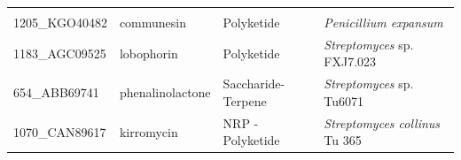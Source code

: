 \documentclass[12pt,twoside]{reedthesis}
\begin{document}
\begin{longtable}[]{@{}llll@{}}
\begin{minipage}[t]{0.34\columnwidth}
  \end{minipage}\tabularnewline
  \begin{minipage}[t]{0.19\columnwidth}\raggedright\strut
  1205\_KGO40482\strut
  \end{minipage} & \begin{minipage}[t]{0.20\columnwidth}\raggedright\strut
  communesin\strut
  \end{minipage} & \begin{minipage}[t]{0.15\columnwidth}\raggedright\strut
  Polyketide\strut
  \end{minipage} & \begin{minipage}[t]{0.34\columnwidth}\raggedright\strut
  \emph{Penicillium expansum}\strut
  \end{minipage}\tabularnewline
  \begin{minipage}[t]{0.19\columnwidth}\raggedright\strut
  1183\_AGC09525\strut
  \end{minipage} & \begin{minipage}[t]{0.20\columnwidth}\raggedright\strut
  lobophorin\strut
  \end{minipage} & \begin{minipage}[t]{0.15\columnwidth}\raggedright\strut
  Polyketide\strut
  \end{minipage} & \begin{minipage}[t]{0.34\columnwidth}\raggedright\strut
  \emph{Streptomyces} sp. FXJ7.023\strut
  \end{minipage}\tabularnewline
  \begin{minipage}[t]{0.19\columnwidth}\raggedright\strut
  654\_ABB69741\strut
  \end{minipage} & \begin{minipage}[t]{0.20\columnwidth}\raggedright\strut
  phenalinolactone\strut
  \end{minipage} & \begin{minipage}[t]{0.15\columnwidth}\raggedright\strut
  Saccharide-Terpene\strut
  \end{minipage} & \begin{minipage}[t]{0.34\columnwidth}\raggedright\strut
  \emph{Streptomyces} sp. Tu6071\strut
  \end{minipage}\tabularnewline
  \begin{minipage}[t]{0.19\columnwidth}\raggedright\strut
  1070\_CAN89617\strut
  \end{minipage} & \begin{minipage}[t]{0.20\columnwidth}\raggedright\strut
  kirromycin\strut
  \end{minipage} & \begin{minipage}[t]{0.15\columnwidth}\raggedright\strut
  NRP - Polyketide\strut
  \end{minipage} & \begin{minipage}[t]{0.34\columnwidth}\raggedright\strut
  \emph{Streptomyces collinus} Tu 365\strut
  \end{minipage}\tabularnewline
  \bottomrule
  \end{longtable}
  
\end{document}
